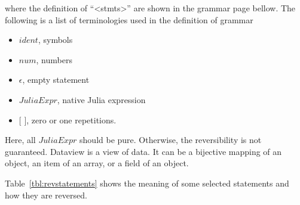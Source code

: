 \documentclass{article}
\newcommand{\<}{\langle}
\renewcommand{\>}{\rangle}
\newcommand{\Tbl}[1]{Table~\ref{#1}}
\theoremstyle{definition}\newtheorem{definition}{\textit{Definition}}
\begin{document}
where the definition of ``<stmts>'' are shown in the grammar page bellow.
The following is a list of terminologies used in the definition of grammar
\begin{itemize}
    \item $ident$, symbols
    \item $num$, numbers
    \item $\epsilon$, empty statement
    \item $JuliaExpr$, native Julia expression
    \item $[$ $]$,  zero or one repetitions.
\end{itemize}
Here, all $JuliaExpr$ should be pure. Otherwise, the reversibility is not guaranteed.
Dataview is a view of data. It can be a bijective mapping of an object, an item of an array, or a field of an object.

\begin{minipage}{0.6\textwidth}
    \small

\end{minipage}

\Tbl{tbl:revstatements} shows the meaning of some selected statements and how they are reversed.
\end{document}
